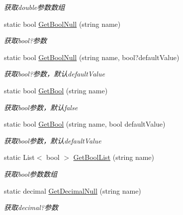 \begin{DoxyCompactItemize}
\begin{DoxyCompactList}\small\item\em 获取double参数数组 \end{DoxyCompactList}\item 
static bool \hyperlink{class_x_c_l_net_tools_1_1_string_hander_1_1_form_helper_aaae65e05af2afe209759febba7ecdbd3}{Get\-Bool\-Null} (string name)
\begin{DoxyCompactList}\small\item\em 获取bool?参数 \end{DoxyCompactList}\item 
static bool \hyperlink{class_x_c_l_net_tools_1_1_string_hander_1_1_form_helper_a5ea790cf8ea2f82c6aa844b2bb1e2172}{Get\-Bool\-Null} (string name, bool?default\-Value)
\begin{DoxyCompactList}\small\item\em 获取bool?参数，默认default\-Value \end{DoxyCompactList}\item 
static bool \hyperlink{class_x_c_l_net_tools_1_1_string_hander_1_1_form_helper_a4eff1989f45cc5ae4608ba374956be17}{Get\-Bool} (string name)
\begin{DoxyCompactList}\small\item\em 获取bool参数，默认false \end{DoxyCompactList}\item 
static bool \hyperlink{class_x_c_l_net_tools_1_1_string_hander_1_1_form_helper_a449ca945de8a73643ac54eab5e37a3ef}{Get\-Bool} (string name, bool default\-Value)
\begin{DoxyCompactList}\small\item\em 获取bool参数，默认default\-Value \end{DoxyCompactList}\item 
static List$<$ bool $>$ \hyperlink{class_x_c_l_net_tools_1_1_string_hander_1_1_form_helper_a134c9765f209b53268358ab4f2bf2821}{Get\-Bool\-List} (string name)
\begin{DoxyCompactList}\small\item\em 获取bool参数数组 \end{DoxyCompactList}\item 
static decimal \hyperlink{class_x_c_l_net_tools_1_1_string_hander_1_1_form_helper_a67ca5ec273b5b94c20a6fd79b0e3c3f7}{Get\-Decimal\-Null} (string name)
\begin{DoxyCompactList}\small\item\em 获取decimal?参数 \end{DoxyCompactList}\item 

\end{DoxyCompactItemize}
